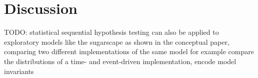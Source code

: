 \section{Discussion}
\label{sec:discussion}

TODO: statistical sequential hypothesis testing can also be applied to exploratory models like the sugarscape as shown in the conceptual paper, comparing two different implementations of the same model for example compare the distributions of a time- and event-driven implementation, encode model invariants 